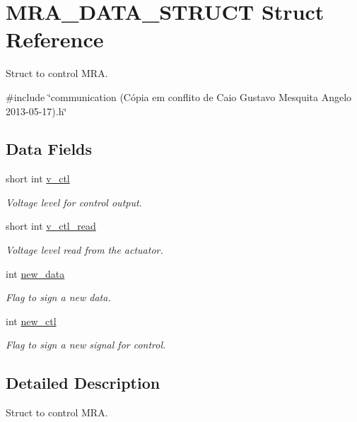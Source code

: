 \hypertarget{structMRA__DATA__STRUCT}{\section{M\-R\-A\-\_\-\-D\-A\-T\-A\-\_\-\-S\-T\-R\-U\-C\-T Struct Reference}
\label{structMRA__DATA__STRUCT}
}


Struct to control M\-R\-A.  




{\ttfamily \#include \char`\"{}communication (\-Cópia em conflito de Caio Gustavo Mesquita Angelo 2013-\/05-\/17).\-h\char`\"{}}

\subsection*{Data Fields}
\begin{DoxyCompactItemize}
\item 
short int \hyperlink{structMRA__DATA__STRUCT_a64b4e6bb604e58de593a60c87942b966}{v\-\_\-ctl}
\begin{DoxyCompactList}\small\item\em Voltage level for control output. \end{DoxyCompactList}\item 
short int \hyperlink{structMRA__DATA__STRUCT_a3a31d57268c33b21ac915fdc27dfe474}{v\-\_\-ctl\-\_\-read}
\begin{DoxyCompactList}\small\item\em Voltage level read from the actuator. \end{DoxyCompactList}\item 
int \hyperlink{structMRA__DATA__STRUCT_afca6e851d302f3a786885a4e1eec79d7}{new\-\_\-data}
\begin{DoxyCompactList}\small\item\em Flag to sign a new data. \end{DoxyCompactList}\item 
int \hyperlink{structMRA__DATA__STRUCT_a5b1af89ee717f5b14c18e8ac12e93e75}{new\-\_\-ctl}
\begin{DoxyCompactList}\small\item\em Flag to sign a new signal for control. \end{DoxyCompactList}\end{DoxyCompactItemize}


\subsection{Detailed Description}
Struct to control M\-R\-A. 

